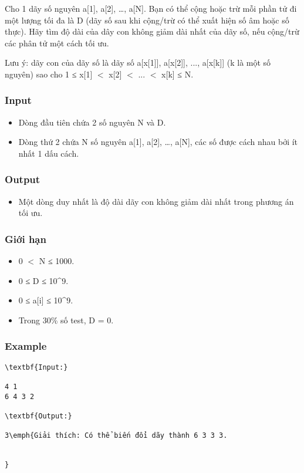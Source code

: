 



   Cho 1 dãy số nguyên a[1], a[2], …, a[N]. Bạn có thể cộng hoặc trừ mỗi phần tử đi một lượng tối đa là D (dãy số sau khi cộng/trừ có thể xuất hiện số âm hoặc số thực). Hãy tìm độ dài của dây con không giảm dài nhất của dãy số, nếu cộng/trừ các phân tử một cách tối ưu.  

Lưu ý: dãy con của dãy số là dãy số a[x[1]], a[x[2]], ..., a[x[k]] (k là một số nguyên) sao cho 1 ≤ x[1] $<$ x[2] $<$ ... $<$ x[k] ≤ N.

\subsubsection{   Input  }
\begin{itemize}
	\item     Dòng đầu tiên chứa 2 số nguyên N và D.   
	\item     Dòng thứ 2 chứa N số nguyên a[1], a[2], …, a[N], các số được cách nhau bởi ít nhất 1 dấu cách.   
\end{itemize}



\subsubsection{   Output  }
\begin{itemize}
	\item     Một dòng duy nhất là độ dài dãy con không giảm dài nhất trong phương án tối ưu.   
\end{itemize}

\subsubsection{   Giới hạn  }
\begin{itemize}
	\item     0 $<$ N ≤ 1000.   
	\item     0 ≤ D ≤ 10^9.   
	\item     0 ≤ a[i] ≤ 10^9.   
	\item     Trong 30\% số test, D = 0.   
\end{itemize}

\subsubsection{   Example  }
\begin{verbatim}
\textbf{Input:}

4 1
6 4 3 2

\textbf{Output:}

3\emph{Giải thích: Có thể biến đổi dãy thành 6 3 3 3.


}


\end{verbatim}
